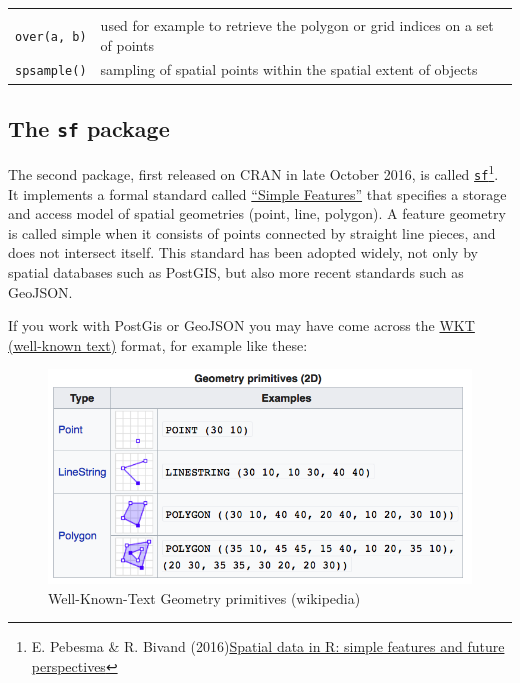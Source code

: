 \documentclass[]{book}
\let\rmarkdownfootnote\footnote%
\def\footnote{\protect\rmarkdownfootnote}
\theoremstyle{definition}
\theoremstyle{definition}
\theoremstyle{definition}
\theoremstyle{remark}
\begin{document}
\begin{longtable}[]{@{}ll@{}}
\begin{minipage}[t]{0.72\columnwidth}
\end{minipage}\tabularnewline
\begin{minipage}[t]{0.17\columnwidth}\raggedright\strut
\texttt{over(a,\ b)}\strut
\end{minipage} & \begin{minipage}[t]{0.72\columnwidth}\raggedright\strut
used for example to retrieve the polygon or grid indices on a set of
points\strut
\end{minipage}\tabularnewline
\begin{minipage}[t]{0.17\columnwidth}\raggedright\strut
\texttt{spsample()}\strut
\end{minipage} & \begin{minipage}[t]{0.72\columnwidth}\raggedright\strut
sampling of spatial points within the spatial extent of objects\strut
\end{minipage}\tabularnewline
\bottomrule
\end{longtable}

\subsection{\texorpdfstring{The \texttt{sf}
package}{The sf package}}\label{the-sf-package}

The second package, first released on CRAN in late October 2016, is
called
\href{https://cran.r-project.org/package=sf}{\texttt{sf}}\footnote{E.
  Pebesma \& R. Bivand
  (2016)\href{http://pebesma.staff.ifgi.de/pebesma_sfr.pdf}{Spatial data
  in R: simple features and future perspectives}}. It implements a
formal standard called
\href{https://en.wikipedia.org/wiki/Simple_Features}{``Simple
Features''} that specifies a storage and access model of spatial
geometries (point, line, polygon). A feature geometry is called simple
when it consists of points connected by straight line pieces, and does
not intersect itself. This standard has been adopted widely, not only by
spatial databases such as PostGIS, but also more recent standards such
as GeoJSON.

If you work with PostGis or GeoJSON you may have come across the
\href{https://en.wikipedia.org/wiki/Well-known_text}{WKT (well-known
text)} format, for example like these:

\begin{figure}
\includegraphics[width=1\linewidth]{img/wkt_primitives} \caption{Well-Known-Text Geometry primitives  (wikipedia)}\label{fig:wkt-primitives}
\end{figure}
\end{document}
